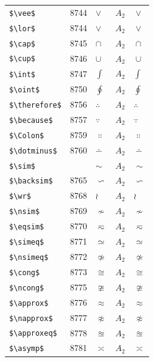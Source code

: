 ﻿\documentclass{article}
\begin{document}
\begin{table}
\begin{center}
\begin{tabular}{llll}
 \verb#$\vee$#            & 8744    & $\vee$            & $A_2\quad \vee$\\
 \verb#$\lor$#            & 8744    & $\lor$            & $A_2\quad \lor$\\
 \verb#$\cap$#            & 8745    & $\cap$            & $A_2\quad \cap$\\
 \verb#$\cup$#            & 8746    & $\cup$            & $A_2\quad \cup$\\
 \verb#$\int$#            & 8747    & $\int$            & $A_2\quad \int$\\
 \verb#$\oint$#           & 8750    & $\oint$           & $A_2\quad \oint$\\
 \verb#$\therefore$#      & 8756    & $\therefore$      & $A_2\quad \therefore$\\
 \verb#$\because$#        & 8757    & $\because$        & $A_2\quad \because$\\
 \verb#$\Colon$#          & 8759    & $\Colon$          & $A_2\quad \Colon$\\
 \verb#$\dotminus$#       & 8760    & $\dotminus$       & $A_2\quad \dotminus$\\
 \verb#$\sim$#            &         & $\sim$            & $A_2\quad \sim$\\
 \verb#$\backsim$#        & 8765    & $\backsim$        & $A_2\quad \backsim$\\
 \verb#$\wr$#             & 8768    & $\wr$             & $A_2\quad \wr$\\
 \verb#$\nsim$#           & 8769    & $\nsim$           & $A_2\quad \nsim$\\
 \verb#$\eqsim$#          & 8770    & $\eqsim$          & $A_2\quad \eqsim$\\
 \verb#$\simeq$#          & 8771    & $\simeq$          & $A_2\quad \simeq$\\
 \verb#$\nsimeq$#         & 8772    & $\nsimeq$         & $A_2\quad \nsimeq$\\
 \verb#$\cong$#           & 8773    & $\cong$           & $A_2\quad \cong$\\
 \verb#$\ncong$#          & 8775    & $\ncong$          & $A_2\quad \ncong$\\
 \verb#$\approx$#         & 8776    & $\approx$         & $A_2\quad \approx$\\
 \verb#$\napprox$#        & 8777    & $\napprox$        & $A_2\quad \napprox$\\
 \verb#$\approxeq$#       & 8778    & $\approxeq$       & $A_2\quad \approxeq$\\
 \verb#$\asymp$#          & 8781    & $\asymp$          & $A_2\quad \asymp$\\

\end{tabular}
\end{center}
\end{table}
\end{document}
